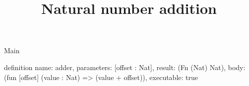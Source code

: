 \begin{lexlean}{Main}
\title{Natural number addition}
\begin{semanticmodule}
definition{
  name: adder,
  parameters: [offset : Nat],
  result: (Fn (Nat) Nat),
  body: (fun [offset] (value : Nat) => (value + offset)),
  executable: true
}
\end{semanticmodule}
\end{lexlean}
